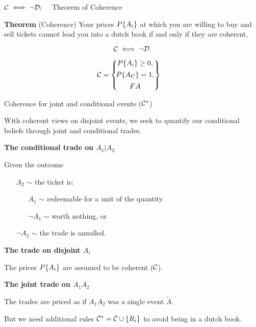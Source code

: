 \begin{frame}{$\mathcal{C}\iff\neg\mathcal{D};\quad$ Theorem of Coherence}
\begin{minipage}[]{0.5\linewidth}
{\textbf{Theorem} (Coherence)}
Your prices $P\{A_i\}$ at which you are willing to buy and sell tickets cannot lead you into a dutch book if and only if they are coherent,

$$\mathcal{C}\iff\neg\mathcal{D}.$$
\end{minipage}
\hfill
\begin{minipage}[]{0.3\linewidth}
\centering
$$
\mathcal{C}
=
\left\{\!\begin{matrix}
P\{A_i\}\ge0, \\[1ex]
P\{A_{C}\}=1, \\[1ex]
FA
\end{matrix}\right\}
\quad
$$
\end{minipage}
\end{frame}

\begin{frame}{Coherence for joint and conditional events ($\mathcal{C}^*$)}
\begin{minipage}{\linewidth}
With coherent views on disjoint events, we seek to quantify our conditional beliefs through joint and conditional trades.
\end{minipage}
\vfill
\begin{minipage}{\linewidth}
\begin{minipage}{0.45\linewidth}
{\textbf{The conditional trade on $A_1|A_2$}}

Given the outcome
\begin{itemize}
\item[$A_2$]$\sim$ the ticket is:
\begin{itemize}
\item[$A_1$] $\sim$ redeemable for a unit of the quantity
\item[$\neg A_1$] $\sim$ worth nothing, or
\end{itemize} 
\item[$\neg A_2$]$\sim$ the trade is annulled.
\end{itemize}
\end{minipage}
\hfill
\begin{minipage}{0.45\linewidth}
\begin{minipage}{\linewidth}
{\textbf{The trade on disjoint $A_i$}}

The prices $P\{A_i\}$ are assumed to be coherent ($\mathcal{C}$).
\end{minipage}
\vfill
\bigskip
\begin{minipage}{\linewidth}
{\textbf{The joint trade on $A_1A_2$}}

The trades are priced as if $A_1A_2$ was a single event $\tilde{A}$.

\end{minipage}
\end{minipage}
\end{minipage}
\vfill
\begin{minipage}{\linewidth}
But we need additional rules $\mathcal{C}^*=\mathcal{C}\cup\{R_i\}$ to avoid being in a dutch book.
\end{minipage}
\end{frame}

